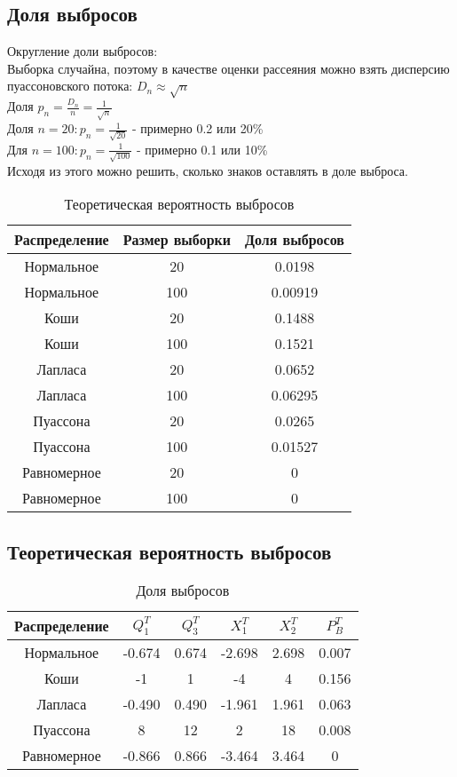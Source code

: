 \documentclass[a4paper,12pt]{article} %
\begin{document}
\subsection{Доля выбросов}
\noindent Округление доли выбросов:\\
Выборка случайна, поэтому в качестве оценки рассеяния можно взять дисперсию пуассоновского потока:  $D_n \approx \sqrt{n}$\\
Доля $p_n = \frac{D_n}{n}=\frac{1}{\sqrt{n}}$\\
Доля $n=20: p_n=\frac{1}{\sqrt{20}}$ - примерно 0.2 или 20\% \\
Для $n=100: p_n=\frac{1}{\sqrt{100}}$ - примерно 0.1 или 10\% \\
Исходя из этого можно решить, сколько знаков оставлять в доле выброса.
\begin{table}[H]
\centering
\begin{tabular}{|c|c|c|}
    \hline
     Распределение & Размер выборки & Доля выбросов \\
     \hline
     Нормальное & 20 & 0.0198\\
     \hline
     Нормальное & 100 & 0.00919\\
     \hline
     Коши & 20 & 0.1488 \\
     \hline
     Коши & 100 & 0.1521\\
     \hline
     Лапласа & 20 & 0.0652\\
     \hline
     Лапласа & 100 & 0.06295\\
     \hline
     Пуассона & 20 & 0.0265 \\
     \hline
     Пуассона & 100 & 0.01527 \\
     \hline
     Равномерное & 20 & 0 \\
     \hline
     Равномерное & 100 & 0\\
     \hline
\end{tabular}
		\caption{Теоретическая вероятность выбросов}
		\label{tab:normal}
	\end{table}
\subsection{Теоретическая вероятность выбросов}
	\begin{table}[H]
		\centering
		\begin{tabular}[t]{|c|c|c|c|c|c|}
			\hline
			Распределение   &      $Q_1^T$	& $Q_3^T$ & $X_1^T$ & $X_2^T$ & $P_B^T$	\\
			\hline
			Нормальное & -0.674& 0.674 & -2.698 	&  2.698 	& 0.007 \\
			\hline
			Коши & -1	& 1		&  -4		& 4			& 0.156 \\
			\hline
			Лапласа	&-0.490	& 0.490	& -1.961	& 1.961		& 0.063\\
			\hline
			Пуассона & 8		& 12	& 2			& 18		& 0.008 \\
			\hline
			Равномерное &-0.866 & 0.866	& -3.464 	& 3.464 	& 0	\\
			
			\hline
		\end{tabular}
\caption{Доля выбросов}\label{outliers}
\end{table}
\end{document}
